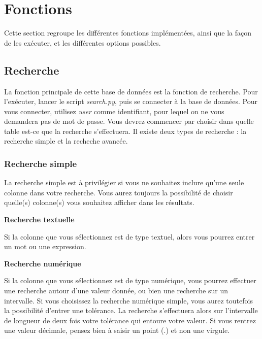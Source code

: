 \documentclass[12pt,a4paper]{article}
\begin{document}
    
    
\clearpage
\section{Fonctions}

    Cette section regroupe les différentes fonctions implémentées, ainsi que la façon de les exécuter, et les différentes options possibles.

    \bigskip
    \subsection{Recherche}\label{recherche}

        La fonction principale de cette base de données est la fonction de recherche.
        Pour l'exécuter, lancer le script \emph{search.py}, puis se connecter à la base de données.
        Pour vous connecter, utilisez \emph{user} comme identifiant, pour lequel on ne vous demandera
        pas de mot de passe.
        Vous devrez commencer par choisir dans quelle table est-ce que la recherche s'effectuera.
        Il existe deux types de recherche : la recherche simple et la recheche avancée.

        \subsubsection{Recherche simple}
            La recherche simple est à privilégier si vous ne souhaitez inclure qu'une seule colonne dans votre recherche.
            Vous aurez toujours la possibilité de choisir quelle(s) colonne(s) vous souhaitez afficher dans les résultats.


            \medskip
            \textbf{Recherche textuelle}

            Si la colonne que vous sélectionnez est de type textuel, alors vous pourrez entrer un mot ou une expression.

            \medskip
            \textbf{Recherche numérique}

            Si la colonne que vous sélectionnez est de type numérique, vous pourrez effectuer une recherche autour d'une valeur donnée,
            ou bien une recherche sur un intervalle. Si vous choisissez la recherche numérique simple, vous aurez toutefois
            la possibilité d'entrer une tolérance. La recherche s'effectuera alors sur l'intervalle de longueur de deux fois votre tolérance
            qui entoure votre valeur.
            Si vous rentrez une valeur décimale, pensez bien à saisir un point (.) et non une virgule.
\end{document}

